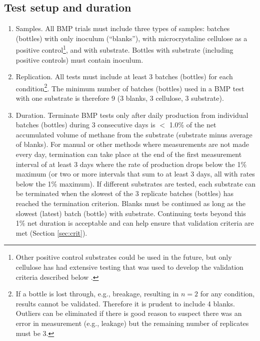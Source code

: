 \documentclass[]{article}
\begin{document}
\subsection{Test setup and duration}
\label{sec:setup}
\begin{enumerate}
  \item Samples. 
    All BMP trials must include three types of samples: batches (bottles) with only inoculum (``blanks''), with microcrystaline cellulose as a positive control\footnote{
      Other positive control substrates could be used in the future, but only cellulose has had extensive testing that was used to develop the validation criteria described below \cite{iis2020}.
    }, and with substrate.
    Bottles with substrate (including positive controls) must contain inoculum.
  \item Replication. 
    All tests must include at least 3 batches (bottles) for each condition\footnote{
      If a bottle is lost through, e.g., breakage, resulting in $n=2$ for any condition, results cannot be validated.
      Therefore it is prudent to include 4 blanks.
      Outliers can be eliminated if there is good reason to suspect there was an error in measurement (e.g., leakage) but the remaining number of replicates must be 3.
    }.
    The minimum number of batches (bottles) used in a BMP test with one substrate is therefore 9 (3 blanks, 3 cellulose, 3 substrate).
  \item Duration. 
    Terminate BMP tests only after daily  production from individual batches (bottles) during 3 consecutive days is $<$ 1.0\% of the net accumulated volume of methane from the substrate (substrate minus average of blanks). 
    For manual or other methods where measurements are not made every day, termination can take place at the end of the first measurement interval of at least 3 days where the rate of production drops below the 1\% maximum (or two or more intervals that sum to at least 3 days, all with rates below the 1\% maximum).
    If different substrates are tested, each substrate can be terminated when the slowest of the 3 replicate batches (bottles) has reached the termination criterion.
    Blanks must be continued as long as the slowest (latest) batch (bottle) with substrate.
    Continuing tests beyond this 1\% net duration is acceptable and can help ensure that validation criteria are met (Section \ref{sec:crit}).
\end{enumerate}
\end{document}
